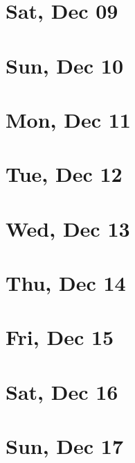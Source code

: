 	\section{Sat, Dec 09}
		
		
	\section{Sun, Dec 10}
		
		
	\section{Mon, Dec 11}
		
		
	\section{Tue, Dec 12}
		
		
	\section{Wed, Dec 13}
		
		
	\section{Thu, Dec 14}
		
		
	\section{Fri, Dec 15}
		
		
	\section{Sat, Dec 16}
		
		
	\section{Sun, Dec 17}
		
		
